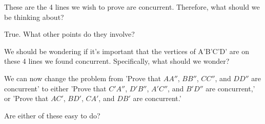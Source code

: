 

These are the 4 lines we wish to prove are concurrent. Therefore, what should we be thinking about?


True. What other points do they involve?








We should be wondering if it's important that the vertices of A'B'C'D' are on these 4 lines we found concurrent. Specifically, what should we wonder?

We can now change the problem from 'Prove that $AA''$, $BB''$, $CC''$, and $DD''$ are concurrent' to either 'Prove that $C'A''$, $D'B''$, $A'C''$, and $B'D''$ are concurrent,' or 'Prove that $AC'$, $BD'$, $CA'$, and $DB'$ are concurrent.'

Are either of these easy to do?



